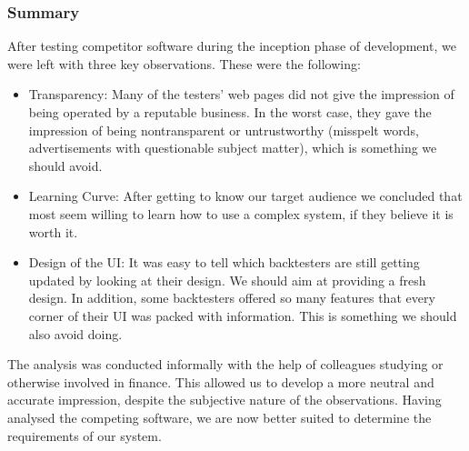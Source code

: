 \documentclass[main.tex]{subfiles}
\begin{document}
\subsubsection{Summary}
\label{reliability}

After testing competitor software during the inception phase of development, we were left with three key observations. These were the following:

\begin{itemize}
    \item Transparency: Many of the testers' web pages did not give the impression of being operated by a reputable business. In the worst case, they gave the impression of being nontransparent or untrustworthy (misspelt words, advertisements with questionable subject matter), which is something we should avoid.
    \item Learning Curve: After getting to know our target audience we concluded that most seem willing to learn how to use a complex system, if they believe it is worth it.
    \item Design of the UI: It was easy to tell which backtesters are still getting updated by looking at their design. We should aim at providing a fresh design. In addition, some backtesters offered so many features that every corner of their UI was packed with information. This is something we should also avoid doing.
    
\end{itemize}

The analysis was conducted informally with the help of colleagues studying or otherwise involved in finance. This allowed us to develop a more neutral and accurate impression, despite the subjective nature of the observations. Having analysed the competing software, we are now better suited to determine the requirements of our system. 
\end{document}
